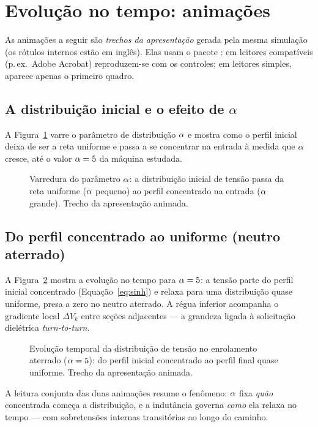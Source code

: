 \section{Evolução no tempo: animações}
\label{sec:animacoes}

As animações a seguir são \emph{trechos da apresentação} gerada pela mesma simulação (os rótulos
internos estão em inglês). Elas usam o pacote : em leitores compatíveis (p.\,ex.\
Adobe Acrobat) reproduzem-se com os controles; em leitores simples, aparece apenas o primeiro quadro.

\subsection{A distribuição inicial e o efeito de \texorpdfstring{$\alpha$}{alpha}}

A Figura~\ref{fig:anim-dist} varre o parâmetro de distribuição \(\alpha\) e mostra como o perfil inicial
deixa de ser a reta uniforme e passa a se concentrar na entrada à medida que \(\alpha\) cresce, até o
valor \(\alpha=5\) da máquina estudada.

\begin{figure}[H]
\centering
{}
\caption{Varredura do parâmetro \(\alpha\): a distribuição inicial de tensão passa da reta uniforme
(\(\alpha\) pequeno) ao perfil concentrado na entrada (\(\alpha\) grande). Trecho da apresentação
animada.}
\label{fig:anim-dist}
\end{figure}

\subsection{Do perfil concentrado ao uniforme (neutro aterrado)}

A Figura~\ref{fig:anim-evol} mostra a evolução no tempo para \(\alpha=5\): a tensão parte do perfil
inicial concentrado (Equação~\eqref{eq:sinh}) e relaxa para uma distribuição quase uniforme, presa a
zero no neutro aterrado. A régua inferior acompanha o gradiente local \(\Delta V_k\) entre seções
adjacentes — a grandeza ligada à solicitação dielétrica \emph{turn-to-turn}.

\begin{figure}[H]
\centering
{}
\caption{Evolução temporal da distribuição de tensão no enrolamento aterrado (\(\alpha=5\)): do perfil
inicial concentrado ao perfil final quase uniforme. Trecho da apresentação animada.}
\label{fig:anim-evol}
\end{figure}

A leitura conjunta das duas animações resume o fenômeno: \(\alpha\) fixa \emph{quão} concentrada começa
a distribuição, e a indutância governa \emph{como} ela relaxa no tempo — com sobretensões internas
transitórias ao longo do caminho.
